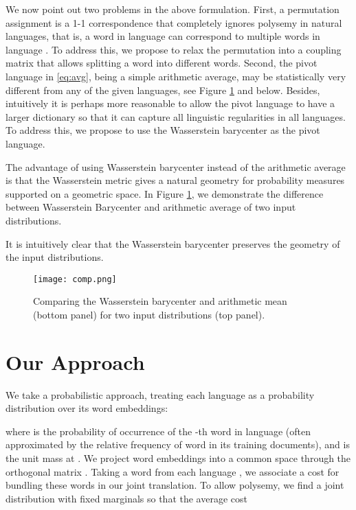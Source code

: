 \documentclass{article}
\begin{document}
We now point out two problems in the above formulation. First, a permutation assignment is a 1-1 correspondence that completely ignores polysemy in natural languages,  that is, a word in language  can correspond to multiple words in language . To address this, we propose to relax the permutation  into a coupling matrix that allows splitting a word into different words. Second, the pivot language in \eqref{eq:avg}, being a simple arithmetic average, may be statistically very different from any of the  given languages, see Figure \ref{fig:barycenter-1} and below. Besides, intuitively it is perhaps more reasonable to allow the pivot language to have a larger dictionary so that it can capture all linguistic regularities in all  languages. To address this, we propose to use the Wasserstein barycenter as the pivot language.

The advantage of using Wasserstein barycenter instead of the arithmetic average is that the Wasserstein metric gives a natural geometry for probability measures supported on a geometric space. In Figure \ref{fig:barycenter-1}, we demonstrate the difference between Wasserstein Barycenter and arithmetic average of two input distributions. 

It is intuitively clear that the Wasserstein barycenter preserves the geometry of the input distributions.
\begin{figure}
    \centering
    \texttt{[image: comp.png]}
\caption{Comparing the Wasserstein barycenter and arithmetic mean (bottom panel) for two input distributions (top panel).}
    \label{fig:barycenter-1}
\end{figure}

 \section{Our Approach}


We take a probabilistic approach, treating each language  as a probability distribution over its word embeddings:

where  is the probability of occurrence of the -th word  in language  (often approximated by the relative frequency of word  in its training documents), and   is the unit mass at . We project word embeddings into a common space through the orthogonal matrix . Taking a word  from each language , we associate a cost  for bundling these words in our joint translation. To allow polysemy, we find a joint  distribution  with fixed marginals  so that the average cost
\end{document}
